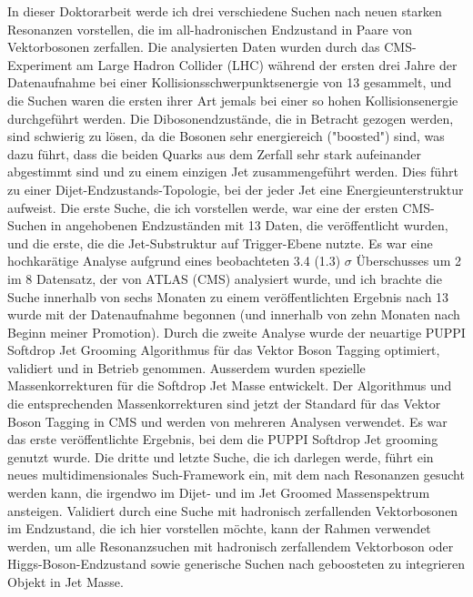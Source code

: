 \small
\noindent In dieser Doktorarbeit werde ich drei verschiedene Suchen nach neuen starken Resonanzen vorstellen, die im all-hadronischen Endzustand in Paare von Vektorbosonen zerfallen. Die analysierten Daten wurden durch das CMS-Experiment am Large Hadron Collider (LHC) während der ersten drei Jahre der Datenaufnahme bei einer Kollisionsschwerpunktsenergie von 13 \TeV gesammelt, und die Suchen waren die ersten ihrer Art jemals bei einer so hohen Kollisionsenergie durchgeführt werden. Die Dibosonendzustände, die in Betracht gezogen werden, sind schwierig zu lösen, da die Bosonen sehr energiereich ("boosted") sind, was dazu führt, dass die beiden Quarks aus dem Zerfall sehr stark aufeinander abgestimmt sind und zu einem einzigen Jet zusammengeführt werden. Dies führt zu einer Dijet-Endzustands-Topologie, bei der jeder Jet eine Energieunterstruktur aufweist. Die erste Suche, die ich vorstellen werde, war eine der ersten CMS-Suchen in angehobenen Endzuständen mit 13 \TeV Daten, die veröffentlicht wurden, und die erste, die die Jet-Substruktur auf Trigger-Ebene nutzte. Es war eine hochkarätige Analyse aufgrund eines beobachteten 3.4 (1.3) $ \sigma$ Überschusses um 2 \TeV im 8 \TeV Datensatz, der von ATLAS (CMS) analysiert wurde, und ich brachte die Suche innerhalb von sechs Monaten zu einem veröffentlichten Ergebnis nach 13 \TeV wurde mit der Datenaufnahme begonnen (und innerhalb von zehn Monaten nach Beginn meiner Promotion). Durch die zweite Analyse wurde der neuartige PUPPI Softdrop Jet Grooming Algorithmus für das Vektor Boson Tagging optimiert, validiert und in Betrieb genommen. Ausserdem wurden spezielle Massenkorrekturen für die Softdrop Jet Masse entwickelt. Der Algorithmus und die entsprechenden Massenkorrekturen sind jetzt der Standard für das Vektor Boson Tagging in CMS und werden von mehreren Analysen verwendet. Es war das erste veröffentlichte Ergebnis, bei dem die PUPPI Softdrop Jet grooming genutzt wurde. Die dritte und letzte Suche, die ich darlegen werde, führt ein neues multidimensionales Such-Framework ein, mit dem nach Resonanzen gesucht werden kann, die irgendwo im Dijet- und im Jet Groomed Massenspektrum ansteigen. Validiert durch eine Suche mit hadronisch zerfallenden Vektorbosonen im Endzustand, die ich hier vorstellen möchte, kann der Rahmen verwendet werden, um alle Resonanzsuchen mit hadronisch zerfallendem Vektorboson oder Higgs-Boson-Endzustand sowie generische Suchen nach geboosteten zu integrieren Objekt in Jet Masse.%
